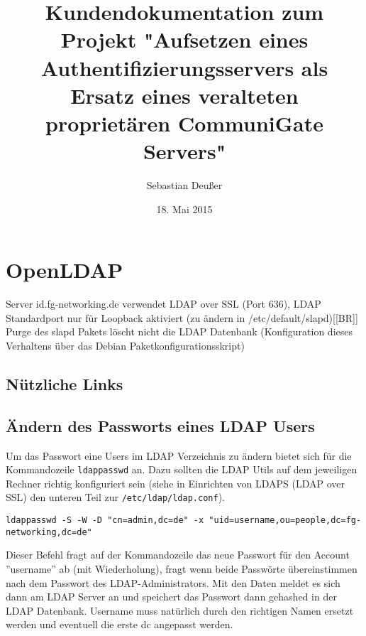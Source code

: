 \documentclass[11pt,a4paper,titlepage=firstiscover]{scrartcl} %
\title{Kundendokumentation zum Projekt "Aufsetzen eines Authentifizierungsservers als Ersatz eines veralteten proprietären CommuniGate Servers"}
\author{Sebastian Deußer}
\date{18. Mai 2015} %
\begin{document}
\maketitle %

\pagestyle{fancy}
\lhead{}
\chead{\leftmark}
\rhead{}
\cfoot{}


\thispagestyle{fancy}
\setcounter{page}{1}  %

\section{OpenLDAP}
Server id.fg-networking.de
verwendet LDAP over SSL (Port 636), LDAP Standardport nur für Loopback aktiviert (zu ändern in /etc/default/slapd)[[BR]]
Purge des slapd Pakets löscht nicht die LDAP Datenbank (Konfiguration dieses Verhaltens über das Debian Paketkonfigurationsskript)


\subsection{Nützliche Links}


\subsection{Ändern des Passworts eines LDAP Users}
Um das Passwort eine Users im LDAP Verzeichnis zu ändern bietet sich für die Kommandozeile \texttt{ldappasswd} an. Dazu sollten die LDAP Utils auf dem jeweiligen Rechner richtig konfiguriert sein (siehe in Einrichten von LDAPS (LDAP over SSL) den unteren Teil zur \texttt{/etc/ldap/ldap.conf}).
\begin{lstlisting}
ldappasswd -S -W -D "cn=admin,dc=de" -x "uid=username,ou=people,dc=fg-networking,dc=de"
\end{lstlisting}
Dieser Befehl fragt auf der Kommandozeile das neue Passwort für den Account ''username'' ab (mit Wiederholung), fragt wenn beide Passwörte übereinstimmen nach dem Passwort des LDAP-Administrators. Mit den Daten meldet es sich dann am LDAP Server an und speichert das Passwort dann gehashed in der LDAP Datenbank. Username muss natürlich durch den richtigen Namen ersetzt werden und eventuell die erste dc angepasst werden.
\end{document}
